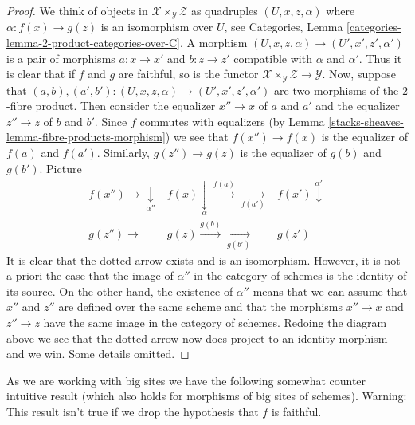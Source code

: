 \begin{proof}
We think of objects in $\mathcal{X} \times_\mathcal{Y} \mathcal{Z}$ as
quadruples $(U, x, z, \alpha)$ where $\alpha : f(x) \to g(z)$ is an
isomorphism over $U$, see
Categories, Lemma \ref{categories-lemma-2-product-categories-over-C}.
A morphism $(U, x, z, \alpha) \to (U', x', z', \alpha')$ is a
pair of morphisms $a : x \to x'$ and $b : z \to z'$ compatible
with $\alpha$ and $\alpha'$. Thus it is clear that if $f$ and
$g$ are faithful, so is the functor
$\mathcal{X} \times_\mathcal{Y} \mathcal{Z} \to \mathcal{Y}$.
Now, suppose that
$(a, b), (a', b') : (U, x, z, \alpha) \to (U', x', z', \alpha')$
are two morphisms of the $2$-fibre product. Then consider the equalizer
$x'' \to x$ of $a$ and $a'$ and the equalizer $z'' \to z$ of $b$ and $b'$.
Since $f$ commutes with equalizers (by
Lemma \ref{stacks-sheaves-lemma-fibre-products-morphism})
we see that $f(x'') \to f(x)$ is the equalizer of $f(a)$ and $f(a')$.
Similarly, $g(z'') \to g(z)$ is the equalizer of $g(b)$ and $g(b')$.
Picture
$$
\begin{array}{ccc}f(x'') \longrightarrow\underset{\alpha''}{\downarrow} & f(x) \underset{\alpha}{\downarrow}\overset{f(a)}{\longrightarrow}\underset{f(a')}{\longrightarrow} & f(x') \overset{\alpha'}{\downarrow} \\ g(z'') \longrightarrow & g(z)
\overset{g(b)}{\longrightarrow}\underset{g(b')}{\longrightarrow} & g(z')\end{array}
$$
It is clear that the dotted arrow exists and is an isomorphism.
However, it is not a priori the case that the image of $\alpha''$
in the category of schemes is the identity of its source. On the other
hand, the existence of $\alpha''$ means that we can assume that $x''$
and $z''$ are defined over the same scheme and that the morphisms
$x'' \to x$ and $z'' \to z$ have the same image in the category of schemes.
Redoing the diagram above we see that the dotted arrow now does
project to an identity morphism and we win. Some details omitted.
\end{proof}

As we are working with big sites we have the following somewhat
counter intuitive result (which also holds for morphisms of big sites
of schemes). Warning: This result isn't true if we drop the hypothesis
that $f$ is faithful.

